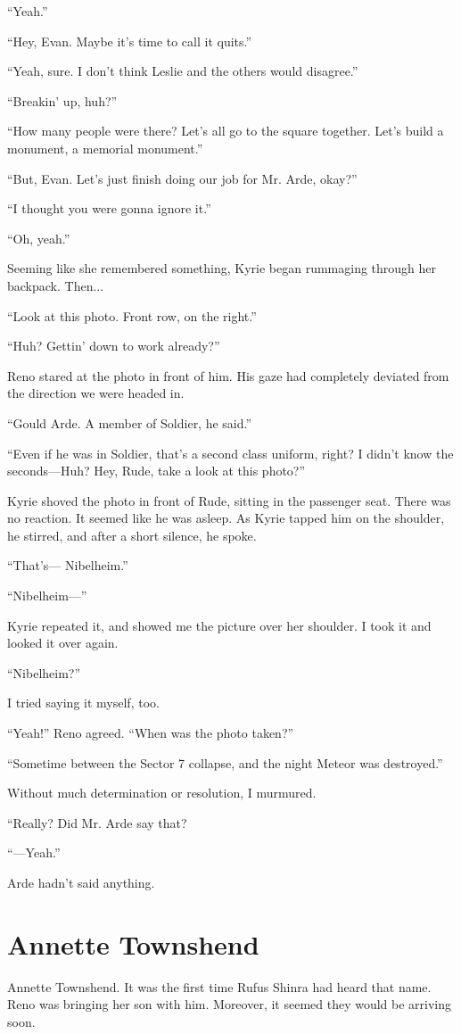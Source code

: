 \documentclass[oneside]{book}
\begin{document}
“Yeah.”

“Hey, Evan. Maybe it’s time to call it quits.”

“Yeah, sure. I don’t think Leslie and the others would disagree.”

“Breakin’ up, huh?”

“How many people were there? Let’s all go to the square together. Let’s build a monument, a memorial monument.”

“But, Evan. Let’s just finish doing our job for Mr. Arde, okay?”

“I thought you were gonna ignore it.”

“Oh, yeah.”

Seeming like she remembered something, Kyrie began rummaging through her backpack. Then...

“Look at this photo. Front row, on the right.”

“Huh? Gettin’ down to work already?”

Reno stared at the photo in front of him. His gaze had completely deviated from the direction we were headed in.

“Gould Arde. A member of Soldier, he said.”

“Even if he was in Soldier, that’s a second class uniform, right? I didn’t know the seconds—Huh? Hey, Rude, take a look at this photo?”

Kyrie shoved the photo in front of Rude, sitting in the passenger seat. There was no reaction. It seemed like he was asleep. As Kyrie tapped him on the shoulder, he stirred, and after a short silence, he spoke.

“That’s— Nibelheim.”

“Nibelheim—”

Kyrie repeated it, and showed me the picture over her shoulder. I took it and looked it over again.

“Nibelheim?”

I tried saying it myself, too.

“Yeah!” Reno agreed. “When was the photo taken?”

“Sometime between the Sector 7 collapse, and the night Meteor was destroyed.”

Without much determination or resolution, I murmured.

“Really? Did Mr. Arde say that?

“—Yeah.”

Arde hadn’t said anything.

\chapter{Annette Townshend}
Annette Townshend. It was the first time Rufus Shinra had heard that name. Reno was bringing her son with him. Moreover, it seemed they would be arriving soon.
\end{document}
